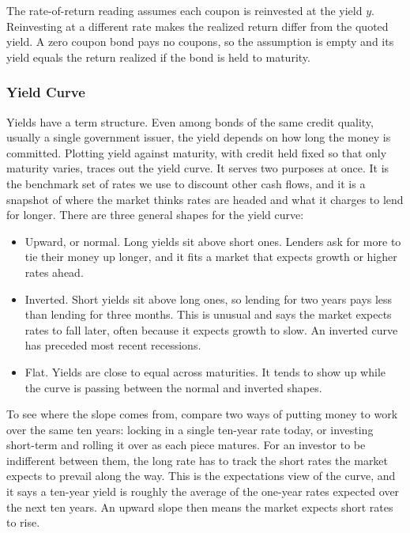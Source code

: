 \begin{remark}
The rate-of-return reading assumes each coupon is reinvested at the yield $y$. Reinvesting at a different rate makes the realized return differ from the quoted yield. A zero coupon bond pays no coupons, so the assumption is empty and its yield equals the return realized if the bond is held to maturity.
\end{remark}

\medskip

\subsubsection{Yield Curve}

\medskip

Yields have a term structure. Even among bonds of the same credit quality, usually a single government issuer, the yield depends on how long the money is committed. Plotting yield against maturity, with credit held fixed so that only maturity varies, traces out the yield curve. It serves two purposes at once. It is the benchmark set of rates we use to discount other cash flows, and it is a snapshot of where the market thinks rates are headed and what it charges to lend for longer. There are three general shapes for the yield curve:
\begin{itemize}[label=--, itemsep=0.3em]
    \item Upward, or normal. Long yields sit above short ones. Lenders ask for more to tie their money up longer, and it fits a market that expects growth or higher rates ahead.
    \item Inverted. Short yields sit above long ones, so lending for two years pays less than lending for three months. This is unusual and says the market expects rates to fall later, often because it expects growth to slow. An inverted curve has preceded most recent recessions.
    \item Flat. Yields are close to equal across maturities. It tends to show up while the curve is passing between the normal and inverted shapes.
\end{itemize}

To see where the slope comes from, compare two ways of putting money to work over the same ten years: locking in a single ten-year rate today, or investing short-term and rolling it over as each piece matures. For an investor to be indifferent between them, the long rate has to track the short rates the market expects to prevail along the way. This is the expectations view of the curve, and it says a ten-year yield is roughly the average of the one-year rates expected over the next ten years. An upward slope then means the market expects short rates to rise.

